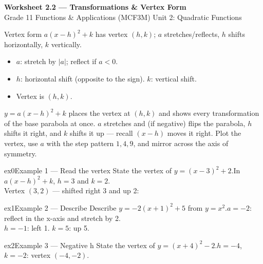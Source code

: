 \documentclass[11pt]{article}
\begin{document}
\begin{center}
{\LARGE\bfseries\color{titleblue}Worksheet 2.2 --- Transformations \& Vertex Form}\\[2pt]
{\small Grade 11 Functions \& Applications (MCF3M) \textperiodcentered{} Unit 2: Quadratic Functions}
\end{center}

\begin{ideabox}
Vertex form $a(x-h)^2+k$ has vertex $(h,k)$; $a$ stretches/reflects, $h$ shifts horizontally, $k$ vertically.
\begin{itemize}[leftmargin=*,itemsep=2pt]
  \item $a$: stretch by $|a|$; reflect if $a<0$.
  \item $h$: horizontal shift (opposite to the sign). $k$: vertical shift.
  \item Vertex is $(h,k)$.
\end{itemize}
\end{ideabox}

\begin{learnbox}
$y=a(x-h)^2+k$ places the vertex at $(h,k)$ and shows every transformation of the base parabola at once.
$a$ stretches and (if negative) flips the parabola, $h$ shifts it right, and $k$ shifts it up — recall $(x-h)$ moves it right.
Plot the vertex, use $a$ with the step pattern $1,4,9$, and mirror across the axis of symmetry.
\end{learnbox}


\begin{example}{ex0}{Example 1 --- Read the vertex}
State the vertex of $y=(x-3)^2+2$.\soln In $a(x-h)^2+k$, $h=3$ and $k=2$. \\ Vertex $(3,2)$ — shifted right 3 and up 2:
\end{example}

\begin{example}{ex1}{Example 2 --- Describe}
Describe $y=-2(x+1)^2+5$ from $y=x^2$.\soln $a=-2$: reflect in the x-axis and stretch by 2. \\ $h=-1$: left 1. $k=5$: up 5.
\end{example}

\begin{example}{ex2}{Example 3 --- Negative h}
State the vertex of $y=(x+4)^2-2$.\soln $h=-4$, $k=-2$: vertex $(-4,-2)$.
\end{example}
\end{document}
